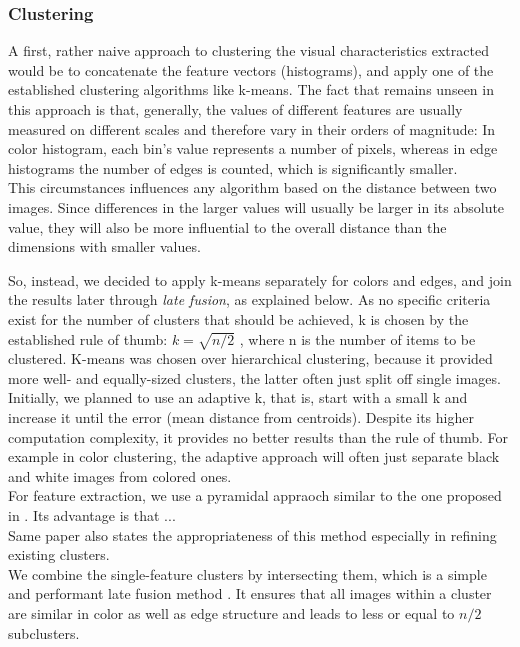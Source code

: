 \subsubsection{Clustering}
A first, rather naive approach to clustering the visual characteristics extracted would be to concatenate the feature vectors (histograms), and apply one of the established clustering algorithms like k-means.  The fact that remains unseen in this approach is that, generally, the values of different features are usually measured on different scales and therefore vary in their orders of magnitude: In color histogram, each bin's value represents a number of pixels, whereas in edge histograms the number of edges is counted, which is significantly smaller. \\
This circumstances influences any algorithm based on the distance between two images. Since differences in the larger values will usually be larger in its absolute value, they will also be more influential to the overall distance than the dimensions with smaller values.

So, instead, we decided to apply k-means separately for colors and edges, and join the results later through \emph{late fusion}, as explained below. As no specific criteria exist for the number of clusters that should be achieved, k is chosen by the established rule of thumb: $ k = \sqrt{n/2} $ \cite[p.365]{mardia1979}, where n is the number of items to be clustered. K-means was chosen over hierarchical clustering, because it provided more well- and equally-sized clusters, the latter often just split off single images.\\
Initially, we planned to use an adaptive k, that is, start with a small k and increase it until the error (mean distance from centroids). Despite its higher computation complexity, it provides no better results than the rule of thumb. For example in color clustering, the adaptive approach will often just separate black and white images from colored ones.\\
For feature extraction, we use a pyramidal appraoch similar to the one proposed in \cite{Lazebnik2006}. Its advantage is that ... \\
Same paper also states the appropriateness of this method especially in refining existing clusters.\\
We combine the single-feature clusters by intersecting them, which is a simple and performant late fusion method . It ensures that all images within a cluster are similar in color as well as edge structure and leads to less or equal to $ n/2 $ subclusters.
